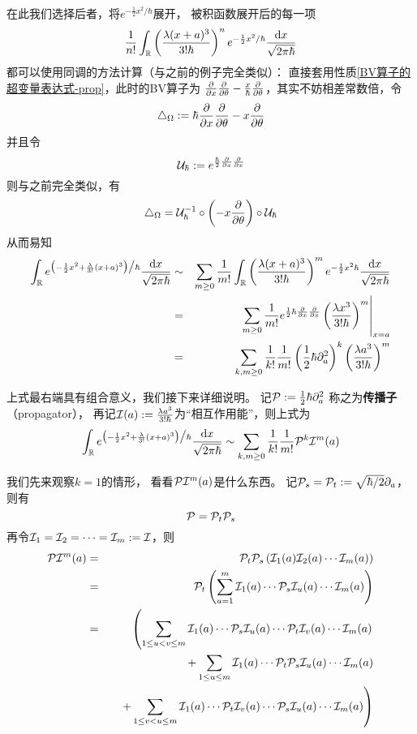 在此我们选择后者，将$e^{-\frac{1}{2}x^2\big/\hbar}$展开，
被积函数展开后的每一项
$$
  \frac{1}{n!}
    \int_{\mathbb{R}}
      \left(
        \frac{\lambda (x+a)^3}{3!\hbar}
      \right)^n
      e^{-\frac{1}{2}x^2/\hbar}
      \frac{\mathrm{d} x}{\sqrt{2\pi\hbar}}
$$
都可以使用同调的方法计算（与之前的例子完全类似）：
直接套用性质\ref{BV算子的超变量表达式-prop}，此时的BV算子为
$\frac{\partial } {\partial x}\frac{\partial } {\partial \theta}-\frac{x}{\hbar}\frac{\partial } {\partial \theta}$，其实不妨相差常数倍，令
$$\triangle_{\Omega}:=\hbar\frac{\partial } {\partial x}\frac{\partial } {\partial \theta}-x\frac{\partial } {\partial \theta}$$
并且令
$$\mathcal{U}_{\hbar}:=e^{\frac{\hbar}{2}\frac{\partial } {\partial x}\frac{\partial } {\partial x}}$$
则与之前完全类似，有
$$\triangle_\Omega
=\mathcal{U}_\hbar^{-1}\circ
\left(-x\frac{\partial } {\partial \theta}\right)\circ\mathcal{U}_\hbar$$
从而易知
\begin{eqnarray*}
     \int_{\mathbb{R}}
       e^{\big(
            -\frac{1}{2}x^2
            +\frac{\lambda}{3!}(x+a)^3
          \big)
          \big/\hbar}
       \frac{\mathrm{d} x}{\sqrt{2\pi\hbar}}
&\sim&
     \sum_{m\geq 0}\frac{1}{m!}
       \int_{\mathbb{R}}
         \left(
           \frac{\lambda(x+a)^3}{3!\hbar}
         \right)^m
         e^{-\frac{1}{2}x^2\hbar}
       \frac{\mathrm{d} x}{\sqrt{2\pi\hbar}}\\
&=&
     \left.
       \sum_{m\geq 0}\frac{1}{m!}
         e^{\frac{1}{2}\hbar\frac{\partial } {\partial x}\frac{\partial } {\partial x}}
         \left(
           \frac{\lambda x^3}{3!\hbar}
         \right)^m
     \right|_{x=a}\\
&=&
     \sum_{k,m\geq 0}
       \frac{1}{k!}
       \frac{1}{m!}
       \left(
         \frac{1}{2}\hbar\partial_a^2
       \right)^k
       \left(
         \frac{\lambda a^3}{3!\hbar}
       \right)^m
\end{eqnarray*}

上式最右端具有组合意义，我们接下来详细说明。
记$\mathcal{P}:=\frac{1}{2}\hbar\partial_{a}^2$
称之为\textbf{传播子}（propagator），
再记$\mathcal{I}(a):=\frac{\lambda a^3}{3!\hbar}$为“相互作用能”，则上式为
$$
     \int_{\mathbb{R}}
       e^{\big(
            -\frac{1}{2}x^2
            +\frac{\lambda}{3!}(x+a)^3
          \big)
          \big/\hbar}
       \frac{\mathrm{d} x}{\sqrt{2\pi\hbar}}
 \sim
     \sum_{k,m\geq 0}
       \frac{1}{k!}
       \frac{1}{m!}
       \mathcal{P}^k\mathcal{I}^m(a)
$$

我们先来观察$k=1$的情形，
看看$\mathcal{P}\mathcal{I}^m(a)$是什么东西。
记$\mathcal{P}_s=\mathcal{P}_t:=\sqrt{\hbar/2}\partial_{a}$，则有
$$\mathcal{P}=\mathcal{P}_t\mathcal{P}_s$$
再令$\mathcal{I}_1=\mathcal{I}_2=\cdots=\mathcal{I}_m:=\mathcal{I}$，则
\begin{eqnarray*}
     \mathcal{P}\mathcal{I}^m(a)
&=&
     \mathcal{P}_t\mathcal{P}_s
     \left(
       \mathcal{I}_1(a)\mathcal{I}_2(a)\cdots\mathcal{I}_m(a)
     \right)\\
&=&
     \mathcal{P}_t
     \left(
       \sum_{u=1}^m
         \mathcal{I}_1(a)\cdots\mathcal{P}_s\mathcal{I}_u(a)\cdots\mathcal{I}_m(a)
     \right)\\
&=&
     \left(
       \sum_{1\leq u<v\leq m}
         \mathcal{I}_1(a)\cdots\mathcal{P}_s\mathcal{I}_u(a)
         \cdots\mathcal{P}_t\mathcal{I}_v(a)\cdots\mathcal{I}_m(a)
     \right.\\
& &
      \quad
      +\sum_{1\leq u\leq m}
         \mathcal{I}_1(a)\cdots\mathcal{P}_t\mathcal{P}_s\mathcal{I}_u(a)
         \cdots\mathcal{I}_m(a)\\
& &
      \quad
      \left.
      +\sum_{1\leq v<u\leq m}
         \mathcal{I}_1(a)\cdots\mathcal{P}_t\mathcal{I}_v(a)
         \cdots\mathcal{P}_s\mathcal{I}_u(a)\cdots\mathcal{I}_m(a)
     \right)
\end{eqnarray*}

